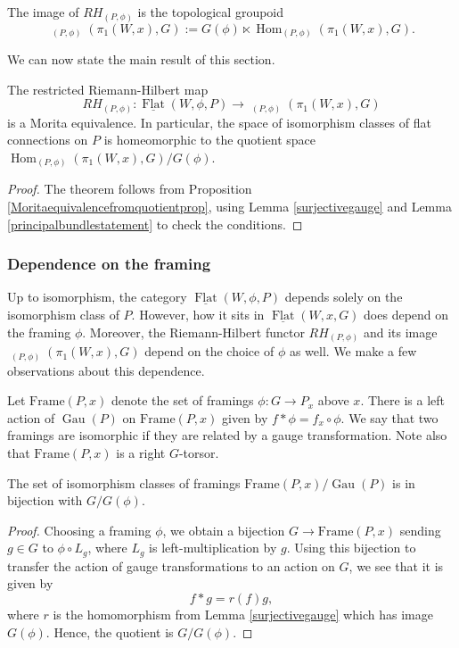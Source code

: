 \documentclass[10pt]{amsart}
\newcommand{\Hom}{\operatorname{Hom}}
\newcommand{\FlatCat}{{\underline{\operatorname{Flat}}}}
\DeclareMathOperator{\Rep}{\underline{\operatorname{Rep}}}
\DeclareMathOperator{\Gau}{Gau}
\numberwithin{theoremalpha}{section}
\numberwithin{equation}{section}
\numberwithin{definition}{section}
\numberwithin{theorem}{section}
\numberwithin{proposition}{section}
\numberwithin{lemma}{section}
\numberwithin{example}{section}
\numberwithin{remark}{section}
\numberwithin{corollary}{section}
\numberwithin{question}{section}
\numberwithin{problem}{section}
\numberwithin{assumption}{section}
\theoremstyle{named}
\numberwithin{equation}{section}
\begin{document}
\begin{corollary}
The image of $RH_{(P,\phi)}$ is the topological groupoid 
\[ \Rep_{(P,\phi)}(\pi_{1}(W, x), G) := G(\phi) \ltimes \Hom_{(P,\phi)}(\pi_{1}(W, x), G). \] 
\end{corollary}

We can now state the main result of this section. 
\begin{theorem} \label{topologicalRHforPB}
The restricted Riemann-Hilbert map 
\[ RH_{(P,\phi)} : \FlatCat(W,\phi,P) \to \Rep_{(P,\phi)}(\pi_{1}(W, x), G) \]
is a Morita equivalence. In particular, the space of isomorphism classes of flat connections on $P$ is homeomorphic to the quotient space $\Hom_{(P,\phi)}(\pi_{1}(W, x), G)/G(\phi)$. 
\end{theorem}
\begin{proof}
The theorem follows from Proposition \ref{Moritaequivalencefromquotientprop}, using Lemma \ref{surjectivegauge} and Lemma \ref{principalbundlestatement} to check the conditions.
\end{proof}


\subsubsection{Dependence on the framing}

Up to isomorphism, the category $\FlatCat(W,\phi,P)$ depends solely on the isomorphism class of $P$. However, how it sits in $\FlatCat(W,x,G)$ does depend on the framing $\phi$. Moreover, the Riemann-Hilbert functor $RH_{(P, \phi)}$ and its image $\Rep_{(P,\phi)}(\pi_{1}(W, x), G)$ depend on the choice of $\phi$ as well. We make a few observations about this dependence. 

Let $\mathrm{Frame}(P,x)$ denote the set of framings $\phi : G \to P_{x}$ above $x$. There is a left action of $\Gau(P)$ on $\mathrm{Frame}(P,x)$ given by $f \ast \phi = f_{x} \circ \phi$. We say that two framings are isomorphic if they are related by a gauge transformation. Note also that $\mathrm{Frame}(P,x)$ is a right $G$-torsor. 

\begin{lemma} \label{isoclassesframing}
The set of isomorphism classes of framings $\mathrm{Frame}(P,x)/\Gau(P)$ is in bijection with $G/G(\phi)$. 
\end{lemma}
\begin{proof}
Choosing a framing $\phi$, we obtain a bijection $G \to \mathrm{Frame}(P,x)$ sending $g \in G$ to $\phi \circ L_{g}$, where $L_{g}$ is left-multiplication by $g$. Using this bijection to transfer the action of gauge transformations to an action on $G$, we see that it is given by 
\[ f \ast g = r(f)g, \]
where $r$ is the homomorphism from Lemma \ref{surjectivegauge} which has image $G(\phi)$. Hence, the quotient is $G/G(\phi)$. 
\end{proof}
\end{document}
